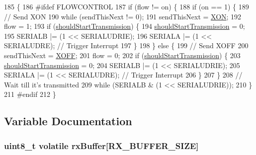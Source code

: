 \begin{DoxyCode}
185                          \{
186 \textcolor{preprocessor}{#ifdef FLOWCONTROL}
187 \textcolor{preprocessor}{}    \textcolor{keywordflow}{if} (flow != on) \{
188         \textcolor{keywordflow}{if} (on == 1) \{
189             \textcolor{comment}{// Send XON}
190             \textcolor{keywordflow}{while} (sendThisNext != 0);
191             sendThisNext = \hyperlink{group__uart_gacdf721774c51e08c6609e6fa8cf82cc9}{XON};
192             flow = 1;
193             \textcolor{keywordflow}{if} (\hyperlink{group__uart_ga7f9fb8e4a004459dd017ce8383fa65ff}{shouldStartTransmission}) \{
194                 \hyperlink{group__uart_ga7f9fb8e4a004459dd017ce8383fa65ff}{shouldStartTransmission} = 0;
195                 SERIALB |= (1 << SERIALUDRIE);
196                 SERIALA |= (1 << SERIALUDRE); \textcolor{comment}{// Trigger Interrupt}
197             \}
198         \} \textcolor{keywordflow}{else} \{
199             \textcolor{comment}{// Send XOFF}
200             sendThisNext = \hyperlink{group__uart_ga67fd78ae15d2b67c10d44d69a49ab1c5}{XOFF};
201             flow = 0;
202             \textcolor{keywordflow}{if} (\hyperlink{group__uart_ga7f9fb8e4a004459dd017ce8383fa65ff}{shouldStartTransmission}) \{
203                 \hyperlink{group__uart_ga7f9fb8e4a004459dd017ce8383fa65ff}{shouldStartTransmission} = 0;
204                 SERIALB |= (1 << SERIALUDRIE);
205                 SERIALA |= (1 << SERIALUDRE); \textcolor{comment}{// Trigger Interrupt}
206             \}
207         \}
208         \textcolor{comment}{// Wait till it's transmitted}
209         \textcolor{keywordflow}{while} (SERIALB & (1 << SERIALUDRIE));
210     \}
211 \textcolor{preprocessor}{#endif}
212 \textcolor{preprocessor}{}\}
\end{DoxyCode}


\subsection{Variable Documentation}
\hypertarget{group__uart_ga8e77b30148ad1a3590ed6b1733ad0bfd}{
\subsubsection[{rx\-Buffer}]{\setlength{\rightskip}{0pt plus 5cm}uint8\-\_\-t volatile rx\-Buffer\mbox{[}{\bf R\-X\-\_\-\-B\-U\-F\-F\-E\-R\-\_\-\-S\-I\-Z\-E}\mbox{]}}}\label{group__uart_ga8e77b30148ad1a3590ed6b1733ad0bfd}


